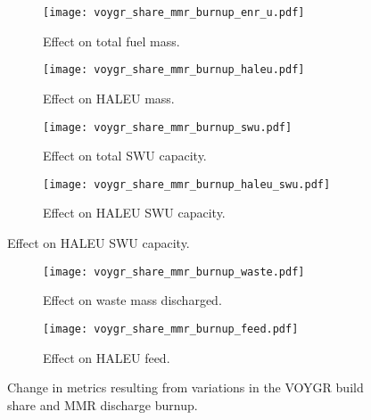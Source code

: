 \begin{figure}
    \begin{subfigure}[t]{0.48\textwidth}
        \centering
        \texttt{[image: voygr\_share\_mmr\_burnup\_enr\_u.pdf]}
        \caption{Effect on total fuel mass.}
        \label{fig:voygr_share_mmr_burnupenr_u}
    \end{subfigure}
    \hfill
    \begin{subfigure}[t]{0.48\textwidth}
        \centering
        \texttt{[image: voygr\_share\_mmr\_burnup\_haleu.pdf]}
        \caption{Effect on HALEU mass.}
        \label{fig:voygr_share_mmr_burnup_haleu}
    \end{subfigure}
    
    \begin{subfigure}[t]{0.48\textwidth}
        \centering
        \texttt{[image: voygr\_share\_mmr\_burnup\_swu.pdf]}
        \caption{Effect on total SWU capacity.}
        \label{fig:voygr_share_mmr_burnup_swu}
    \end{subfigure}
    \hfill
    \begin{subfigure}[t]{0.48\textwidth}
        \centering
        \texttt{[image: voygr\_share\_mmr\_burnup\_haleu\_swu.pdf]}
        \caption{Effect on HALEU SWU capacity.}
        \label{fig:voygr_share_mmr_burnup_haleu_swu}
    \end{subfigure}
\end{figure}

\begin{figure}
    \ContinuedFloat    
    \begin{subfigure}[t]{0.48\textwidth}
        \centering
        \texttt{[image: voygr\_share\_mmr\_burnup\_waste.pdf]}
        \caption{Effect on waste mass discharged.}
        \label{fig:voygr_share_mmr_burnup_waste}
    \end{subfigure}
    \hfill
    \begin{subfigure}[t]{0.48\textwidth}
        \centering
        \texttt{[image: voygr\_share\_mmr\_burnup\_feed.pdf]}
        \caption{Effect on HALEU feed.}
        \label{fig:voygr_share_mmr_burnup_feed}
    \end{subfigure}
    \caption{Change in metrics resulting from variations in the 
    VOYGR build share and MMR discharge burnup.}
    \label{fig:voygr_share_mmr_burnup}
\end{figure}